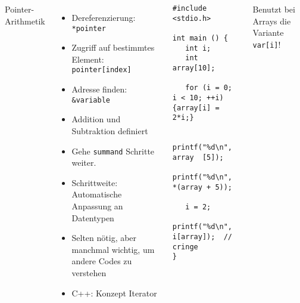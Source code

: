 \begin{frame}[fragile]
%
\begin{columns}[T]
\begin{Large}
{Pointer-Arithmetik}
\vspace{6pt}
\end{Large}
%
\begin{itemize}
\item Dereferenzierung:					\tabto{3.1cm} \texttt{*pointer}
\item Zugriff auf bestimmtes Element:	\tabto{3.1cm} \texttt{pointer[index]}
\item Adresse finden:					\tabto{3.1cm} \texttt{\&variable}
\item Addition und Subtraktion definiert
\item Gehe \texttt{summand} Schritte weiter.
\item Schrittweite: Automatische Anpassung an Datentypen
\item Selten nötig, aber manchmal wichtig, um andere Codes zu verstehen
\item C++: Konzept Iterator
\end{itemize}
%
\vspace{-6pt}
\begin{codebox}
\begin{verbatim}
#include <stdio.h>

int main () {
   int i;
   int array[10];
	
   for (i = 0; i < 10; ++i) {array[i] = 2*i;}
	
   printf("%d\n",   array  [5]);
   printf("%d\n", *(array + 5));

   i = 2;
   printf("%d\n", i[array]);  // cringe
}
\end{verbatim}
\end{codebox}
%
\begin{hintbox}
\footnotesize Benutzt bei Arrays die Variante \texttt{var[i]}!
\end{hintbox}
\end{columns}
%
\end{frame}


